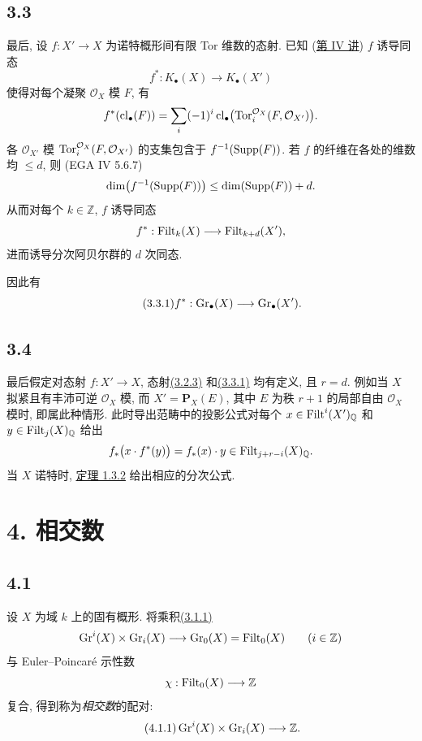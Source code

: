 \subsection*{3.3} 最后, 设 $f:X'\to X$ 为诺特概形间有限 Tor 维数的态射. 已知 (\hyperlink{sga6.e04.expose}{第 IV 讲}) $f$ 诱导同态
%
%
\[
f^*:K_\bullet(X)\longrightarrow K_\bullet(X')
\]
使得对每个凝聚 $\mathcal O_X$ 模 $F$, 有
\[
f^*(\operatorname{cl}_\bullet(F))=
\sum_i(-1)^i\operatorname{cl}_\bullet\bigl(
\operatorname{Tor}_i^{\mathcal O_X}(F,\mathcal O_{X'})\bigr).
\]
各 $\mathcal O_{X'}$ 模 $\operatorname{Tor}_i^{\mathcal O_X}(F,\mathcal O_{X'})$ 的支集包含于 $f^{-1}(\operatorname{Supp}(F))$. 若 $f$ 的纤维在各处的维数均 $\leq d$, 则 (EGA IV 5.6.7)
%
%
%
\[
\dim\bigl(f^{-1}(\operatorname{Supp}(F))\bigr)\leq\dim(\operatorname{Supp}(F))+d.
\]
从而对每个 $k\in\mathbb Z$, $f$ 诱导同态
\[
f^*:\operatorname{Filt}_k(X)\longrightarrow\operatorname{Filt}_{k+d}(X'),
\]
进而诱导分次阿贝尔群的 $d$ 次同态.

因此有
\begin{equation}\tag{3.3.1}
f^*:\operatorname{Gr}_{\bullet}(X)\longrightarrow\operatorname{Gr}_{\bullet}(X').
\end{equation}

\subsection*{3.4}
最后假定对态射 $f:X'\to X$, 态射\hyperlink{sga6.e10.eq.3-2-3}{(3.2.3)} 和\hyperlink{sga6.e10.eq.3-3-1}{(3.3.1)} 均有定义, 且 $r=d$. 例如当 $X$ 拟紧且有丰沛可逆 $\mathcal O_X$ 模, 而 $X'=\mathbf P_X(E)$, 其中 $E$ 为秩 $r+1$ 的局部自由 $\mathcal O_X$ 模时, 即属此种情形. 此时导出范畴中的投影公式对每个 $x\in\operatorname{Filt}^i(X')_{\mathbb Q}$ 和 $y\in\operatorname{Filt}_j(X)_{\mathbb Q}$ 给出
%
%
%
%
%
\[
f_*\bigl(x\cdot f^*(y)\bigr)=f_*(x)\cdot y
\in\operatorname{Filt}_{j+r-i}(X)_{\mathbb Q}.
\]
当 $X$ 诺特时, \hyperlink{sga6.e10.thm.1-3-2}{定理 1.3.2} 给出相应的分次公式.

\section*{4. 相交数}

\subsection*{4.1} 设 $X$ 为域 $k$ 上的固有概形. 将乘积\hyperlink{sga6.e10.eq.3-1-1}{(3.1.1)}
%
\[
\operatorname{Gr}^i(X)\times\operatorname{Gr}_i(X)\longrightarrow\operatorname{Gr}_0(X)=\operatorname{Filt}_0(X)
\qquad(i\in\mathbb Z)
\]
与 Euler--Poincar\'e 示性数
\[
\chi:\operatorname{Filt}_0(X)\longrightarrow\mathbb Z
\]
复合, 得到称为\emph{相交数}的配对:
\begin{equation}\tag{4.1.1}
\operatorname{Gr}^i(X)\times\operatorname{Gr}_i(X)\longrightarrow\mathbb Z.
\end{equation}

